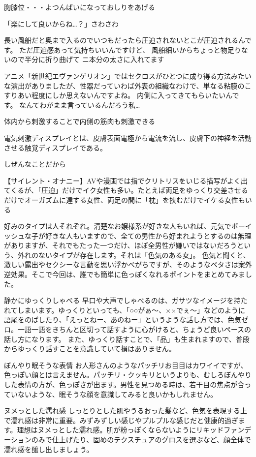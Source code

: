 胸膝位・・・よつんばいになっておしりをあげる

「楽にして良いからね…？」さわさわ

長い風船だと奥まで入るのでいつもだったら圧迫されないとこが圧迫されるんです。
ただ圧迫感あって気持ちいいんですけど、
風船細いからちょっと物足りないので半分に折り曲げて
ニ本分の太さに入れてます


アニメ「新世紀エヴァンゲリオン」ではセクロスがひとつに成り得る方法みたいな演出がありましたが、性器だっていわば外表の組織なわけで、単なる粘膜のこすりあい程度にしか思えないんですよね。
内側に入ってきてもらいたいんです。
なんてわがまま言っているんだろう私…

体内から刺激することで内側の筋肉も刺激できる

電気刺激ディスプレイとは、皮膚表面電極から電流を流し、皮膚下の神経を活動させる触覚ディスプレイである。

しぜんなことだから


【サイレント・オナニー】AVや漫画では指でクリトリスをいじる描写がよく出てくるが、「圧迫」だけでイク女性も多い。たとえば両足をゆっくり交差させるだけでオーガズムに達する女性、両足の間に「枕」を挟むだけでイケる女性もいる



好みのタイプは人それぞれ。清楚なお嬢様系が好きな人もいれば、元気でボーイッシュな子が好きな人もいますので、全ての男性から好まれようとするのは無理がありますが、それでもたった一つだけ、ほぼ全男性が嫌いではないだろうという、外れのないタイプが存在します。それは「色気のある女」。
色気と聞くと、激しい露出やセクシーな言動を思い浮かべがちですが、そのようなベタさは案外逆効果。そこで今回は、誰でも簡単に色っぽくなれるポイントをまとめてみました。

静かにゆっくりしゃべる
早口や大声でしゃべるのは、ガサツなイメージを持たれてしまいます。ゆっくりといっても、「○○がぁ～、××でぇ～」などのように語尾をのばしたり、「えっとねー、あのねー」というような話し方では、色気ゼロ。一語一語をきちんと区切って話すように心がけると、ちょうど良いペースの話し方になります。
また、ゆっくり話すことで、「品」も生まれますので、普段からゆっくり話すことを意識していて損はありません。

ぼんやり眠そうな表情
お人形さんのようなパッチリお目目はカワイイですが、色っぽい顔とは言えません。パッチリ・クッキリというよりも、むしろぼんやりした表情の方が、色っぽさが出ます。男性を見つめる時は、若干目の焦点が合っていないような、眠そうな顔を意識してみると良いかもしれません。

ヌメっとした濡れ感
しっとりとした肌やうるおった髪など、色気を表現する上で濡れ感は非常に重要。みずみずしい感じやプルプルな感じだと健康的過ぎます。理想はヌメっとした濡れ感。肌が粉っぽくならないようにリキッドファンデーションのみで仕上げたり、固めのテクスチュアのグロスを選ぶなど、顔全体で濡れ感を醸し出しましょう。

